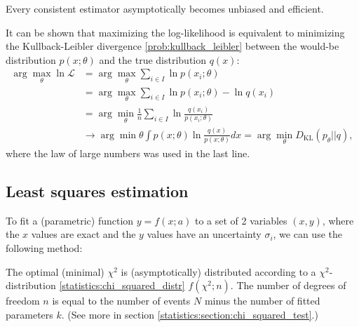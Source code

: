 {    \begin{property}
        Every consistent estimator asymptotically becomes unbiased and efficient.
    \end{property}

    \begin{property}\label{statistics:minimizing_KL}
        It can be shown that maximizing the log-likelihood is equivalent to minimizing the Kullback-Leibler divergence \ref{prob:kullback_leibler} between the would-be distribution $p(x;\theta)$ and the true distribution $q(x)$:
        \begin{align*}
            \arg\max_\theta\ln\mathcal{L} &= \arg\max_\theta\sum_{i\in I}\ln p(x_i;\theta)\\
            &= \arg\max_\theta\sum_{i\in I}\ln p(x_i;\theta) - \ln q(x_i)\\
            &= \arg\min_\theta\frac{1}{n}\sum_{i\in I}\ln\frac{q(x_i)}{p(x_i;\theta)}\\
            &\longrightarrow \arg\min\theta\int p(x;\theta)\ln\frac{q(x)}{p(x;\theta)}dx = \arg\min_\theta D_{\text{KL}}(p_\theta||q),
        \end{align*}
        where the law of large numbers was used in the last line.
    \end{property}

\subsection{Least squares estimation}

    To fit a (parametric) function $y = f(x;a)$ to a set of 2 variables $(x, y)$, where the $x$ values are exact and the $y$ values have an uncertainty $\sigma_i$, we can use the following method:
    \begin{property}
        The optimal (minimal) $\chi^2$ is (asymptotically) distributed according to a $\chi^2$-distribution \ref{statistics:chi_squared_distr} $f(\chi^2;n)$. The number of degrees of freedom $n$ is equal to the number of events $N$ minus the number of fitted parameters $k$. (See more in section \ref{statistics:section:chi_squared_test}.)
    \end{property}

}
